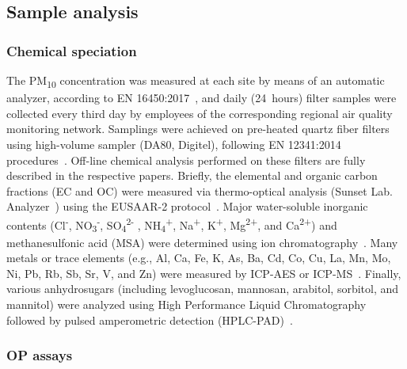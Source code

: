 \documentclass[acp]{copernicus}
\begin{document}
\subsection{Sample analysis}%
\label{sample-analysis}

\subsubsection{Chemical speciation}%
\label{chemical-speciation}

The PM\textsubscript{10} concentration was measured at each site by
means of an automatic analyzer, according to EN 16450:2017~\citep{cenAmbient2017},
and daily (24~hours) filter samples were collected every third day by
employees of the corresponding regional air quality monitoring network.
Samplings were achieved on pre-heated quartz fiber filters using
high-volume sampler (DA80, Digitel), following EN 12341:2014
procedures~\citep{cenAmbient2014}. Off-line chemical analysis performed on these
filters are fully described in the respective papers. Briefly, the
elemental and organic carbon fractions (EC and OC) were measured via
thermo-optical analysis (Sunset Lab. Analyzer~\citep{birchElemental1996})
using the EUSAAR-2 protocol~\citep{cavalliStandardised2010,cenAmbient2017a}. Major
water-soluble inorganic contents (Cl\textsuperscript{-},
NO\textsubscript{3}\textsuperscript{-},
SO\textsubscript{4}\textsuperscript{2-} ,
NH\textsubscript{4}\textsuperscript{+}, Na\textsuperscript{+},
K\textsuperscript{+}, Mg\textsuperscript{2+}, and
Ca\textsuperscript{2+}) and methanesulfonic acid (MSA) were determined
using ion chromatography~\citep{cenAmbient2017b,jaffrezoSize2005}. Many
metals or trace elements (e.g., Al, Ca, Fe, K, As, Ba, Cd, Co, Cu, La,
Mn, Mo, Ni, Pb, Rb, Sb, Sr, V, and Zn) were measured by ICP-AES or
ICP-MS~\citep{allemanPM102010,mbengueSizedistributed2014,cenAmbient2005}. Finally,
various anhydrosugars (including levoglucosan, mannosan, arabitol,
sorbitol, and mannitol) were analyzed using High Performance Liquid
Chromatography followed by pulsed amperometric detection
(HPLC-PAD)~\citep{wakedSource2014}.

\subsubsection{OP assays}%
\label{op-assays}
\end{document}
